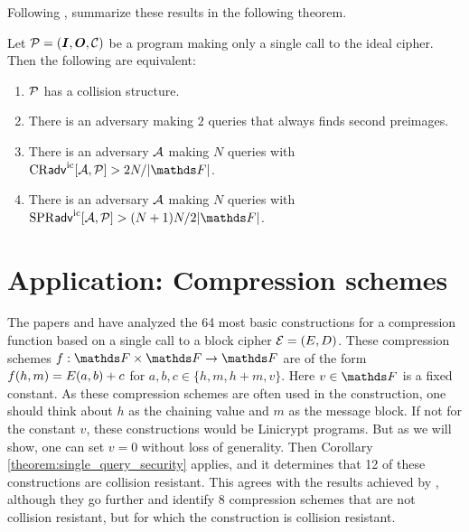 Following \cite[Main Theorem]{TCC:McQSwoRos19TCC:}, summarize these results in the following theorem.
\begin{thm}
\label{theorem:single_query_security}
    Let $\P = (\I, \O, \C)$ be a program making only a single call to the ideal cipher.
    Then the following are equivalent:
    \begin{enumerate}
    \item $\P$ has a collision structure.
    \item There is an adversary making $2$ queries that always finds second preimages.
    \item There is an adversary $\A$ making $N$ queries with $\cradv{\A, \P} > 2N / |\F|$.
    \item There is an adversary $\A$ making $N$ queries with $\spradv{\A, \P} > (N+1)N / 2|\F|$.
    \end{enumerate}
\end{thm}

\section{Application: Compression schemes}

The papers \cite{C:BlaRogShr02} and \cite{C:PreGovVan93} have analyzed the 64 most basic constructions for a compression function
based on a single call to a block cipher $\BC = (\E, \D)$.
These compression schemes $f: \F \times \F \to \F$ are of the form $f(h, m) = \E(a, b) + c$ for $a,b,c \in \{h, m, h+m, v\}$.
Here $v \in \F$ is a fixed constant.
As these compression schemes are often used in the \MD construction,
one should think about $h$ as the chaining value and $m$ as the message block.
If not for the constant $v$, these constructions would be Linicrypt programs.
But as we will show, one can set $v=0$ without loss of generality.
Then Corollary \ref{theorem:single_query_security} applies,
and it determines that 12 of these constructions are collision resistant.
This agrees with the results achieved by \cite{C:BlaRogShr02},
although they go further and identify 8 compression schemes that are not collision resistant,
but for which the \MD construction is collision resistant.

